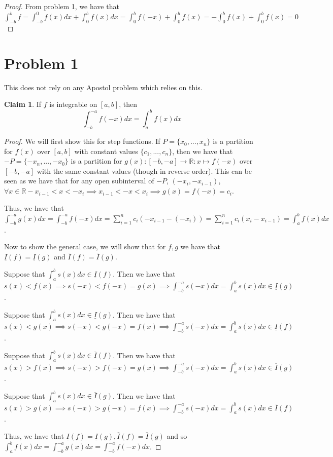 \documentclass[12pt,letterpaper]{article}
\theoremstyle{definition}
\newtheorem*{claim}{Claim}
\newcommand{\R}{\mathbb{R}}
\begin{document}
\begin{proof}
  From problem 1, we have that $\int_{-b}^b f = \int_{-b}^0f(x)dx  + \int_0^b f(x)dx = \int_0^b f(-x) + \int_0^b f(x)  = -\int_0^b f(x) + \int_0^b f(x) = 0 $
\end{proof}

\section*{Problem 1}

This does not rely on any Apostol problem which relies on this.

\begin{claim}
  If $f$ is integrable on $[a,b]$, then
  \[
    \int_{-b}^{-a}f(-x)dx = \int_a^b f(x)dx
  \]
\end{claim}

\begin{proof}
  We will first show this for step functions. If $P = \{x_0,...,x_n\}$ is a partition for $f(x)$ over $[a,b]$ with constant values $\{c_1,...,c_n\}$, then we have that $-P = \{-x_n,...,-x_0\}$ is a partition for $g(x):[-b,-a] \rightarrow \R: x \mapsto f(-x)$ over $[-b, -a]$ with the same constant values (though in reverse order). This can be seen as we have that for any open subinterval of $-P$, $(-x_i, -x_{i-1})$, $\forall x \in \R -x_{i-1} < x < -x_i \implies x_{i-1} < -x < x_i \implies g(x) = f(-x) = c_i$.
  
  Thus, we have that $\int_{-b}^{-a}g(x)dx = \int_{-b}^{-a}f(-x)dx = \sum_{i=1}^n c_i(-x_{i-1} - (-x_i)) = \sum_{i=1}^n c_i(x_i - x_{i-1}) = \int_a^b f(x)dx$.
  
  Now to show the general case, we will show that for $f,g$ we have that $\underline{I}(f) = \underline{I}(g)$ and $\overline{I}(f) = \overline{I}(g)$. 

  Suppose that $\int_a^b s(x)dx \in \underline{I}(f)$. Then we have that $s(x) <
  f(x) \implies s(-x) < f(-x) =g(x) \implies \int_{-b}^{-a}s(-x)dx =
  \int_a^bs(x)dx \in \underline{I}(g)$.

  Suppose that $\int_a^b s(x)dx \in \underline{I}(g)$. Then we have that $s(x) <
  g(x) \implies s(-x) < g(-x) = f(x) \implies \int_{-b}^{-a}s(-x)dx = \int_a^bs(x)dx \in
  \underline{I}(f)$.
  
  Suppose that $\int_a^b s(x)dx \in \overline{I}(f)$. Then we have that $s(x) >
  f(x) \implies s(-x) > f(-x) =g(x) \implies \int_{-b}^{-a}s(-x)dx =
  \int_a^bs(x)dx \in \overline{I}(g)$.

  Suppose that $\int_a^b s(x)dx \in \overline{I}(g)$. Then we have that $s(x) >
  g(x) \implies s(-x) > g(-x) = f(x) \implies \int_{-b}^{-a}s(-x)dx = \int_a^bs(x)dx \in
  \overline{I}(f)$.
  
  Thus, we have that $\underline{I}(f) = \underline{I}(g), \overline{I}(f) =
  \overline{I}(g)$ and so $\int_a^b f(x)dx = \int_{-b}^{-a}g(x)dx = \int_{-b}^{-a}f(-x)dx$. 
\end{proof}
\end{document}
